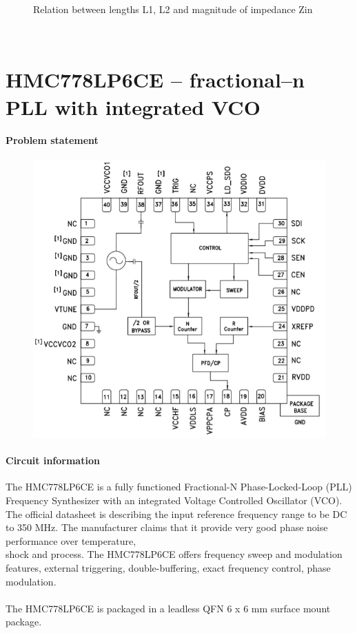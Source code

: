 \documentclass[eng,printmode]{mgr}
\begin{document}
\begin{figure}[!h]
	\caption{Relation between lengths L1, L2 and magnitude of impedance Zin}
	\label{fig:figure1}
\end{figure}
\\

\newpage

\chapter{HMC778LP6CE -- fractional--n PLL with integrated VCO}
\subsubsection{Problem statement}
\begin{figure}[!h]
	\centering
	\includegraphics[width=0.3\linewidth]{pll}
	\label{fig:pll}
\end{figure}
\noindent
\subsubsection{Circuit information}
The HMC778LP6CE is a fully functioned Fractional-N Phase-Locked-Loop (PLL) Frequency Synthesizer with an
integrated Voltage Controlled Oscillator (VCO). \\
The official datasheet is describing the input reference frequency range to be DC to 350 MHz. The manufacturer claims that it provide very good phase noise performance over temperature,\\
shock and process. The HMC778LP6CE offers frequency sweep and modulation features, external
triggering, double-buffering, exact frequency control, phase modulation.\\ \\ The HMC778LP6CE is packaged
in a leadless QFN 6 x 6 mm surface mount package.
\end{document}
